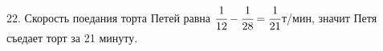22. Скорость поедания торта Петей равна $\cfrac{1}{12}-\cfrac{1}{28}=\cfrac{1}{21}$т/мин, значит Петя съедает торт за 21 минуту.\\
